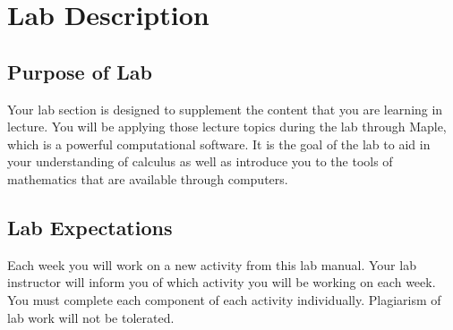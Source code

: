 \chapter{Lab Description}
\label{chp:lab_syllabus}




\section*{Purpose of Lab}
Your lab section is designed to supplement the content that you are learning in lecture. You will be applying those lecture topics during the lab through Maple, which is a powerful computational software. It is the goal of the lab to aid in your understanding of calculus as well as introduce you to the tools of mathematics that are available through computers.

\section*{Lab Expectations}
Each week you will work on a new activity from this lab manual. Your lab instructor will inform you of which activity you will be working on each week. You must complete each component of each activity individually. Plagiarism of lab work will not be tolerated.

